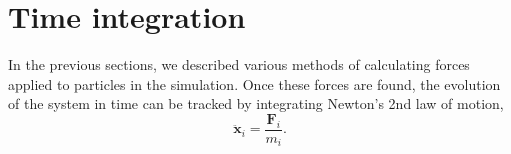 \chapter{Time integration}
In the previous sections, we described various methods of calculating forces applied to particles in the simulation.
Once these forces are found, the evolution of the system in time can be tracked by integrating Newton's 2nd law of motion,
\begin{equation}\label{eq:newtons-second}
    \ddot{\mathbf{x}}_i = \frac{\mathbf{F}_i}{m_i}.
\end{equation}


